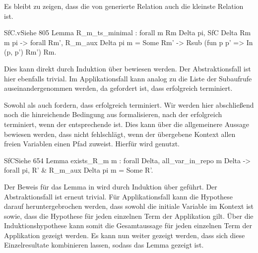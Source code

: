 Es bleibt zu zeigen, dass die von  generierte Relation auch die kleinste Relation ist.
\begin{code}[R_m_ts_minimal]{SfC.v}{Siehe }{805}
Lemma R_m_ts_minimal : forall m Rm Delta pi,  
    SfC Delta Rm m pi -> forall Rm', R_m_aux Delta pi m = Some Rm' -> 
      Rsub (fun p p' => In (p, p') Rm') Rm.
\end{code}
Dies kann direkt durch Induktion über  bewiesen werden. Der Abstraktionsfall ist hier ebenfalls trivial. Im Applikationsfall kann analog zu  die Liste der Subaufrufe auseinandergenommen werden, da gefordert ist, dass  erfolgreich terminiert.

Sowohl  als auch  fordern, dass  erfolgreich terminiert. Wir werden hier abschließend noch die hinreichende Bedingung aus  formalisieren, nach der  erfolgreich terminiert, wenn der entsprechende   ist. Dies kann über die allgemeinere Aussage bewiesen werden, dass  nicht fehlschlägt, wenn der übergebene Kontext allen freien Variablen einen Pfad zuweist. Hierfür wird  genutzt.

\begin{code}[exists_R_m]{SfC}{Siehe }{654}
Lemma exists_R_m m : forall Delta, all_var_in_repo m Delta -> 
    forall pi, { R' & R_m_aux Delta pi m = Some R'}.
\end{code}
Der Beweis für das Lemma in  wird durch Induktion über  geführt. Der Abstraktionsfall ist erneut trivial. Für Applikationsfall kann die Hypothese darauf heruntergebrochen werden, dass sowohl die initiale Variable im Kontext ist sowie, dass die Hypothese für jeden einzelnen Term der Applikation gilt. Über die Induktionshypothese kann somit die Gesamtaussage für jeden einzelnen Term der Applikation gezeigt werden. Es kann nun weiter gezeigt werden, dass sich diese Einzelresultate kombinieren lassen, sodass das Lemma gezeigt ist.


